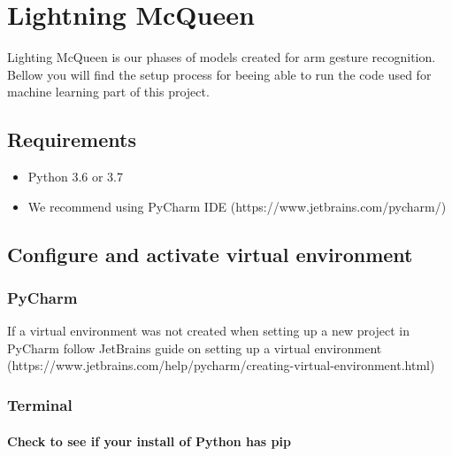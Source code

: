 \documentclass[
]{article}
\author{}
\date{}
\begin{document}
\hypertarget{lightning-mcqueen}{%
\section{Lightning McQueen}\label{lightning-mcqueen}}

Lighting McQueen is our phases of models created for arm gesture
recognition. Bellow you will find the setup process for beeing able to
run the code used for machine learning part of this project.

\hypertarget{requirements}{%
\subsection{Requirements}\label{requirements}}

\begin{itemize}
\item
  Python 3.6 or 3.7
\item
  We recommend using PyCharm IDE (https://www.jetbrains.com/pycharm/)
\end{itemize}

\hypertarget{configure-and-activate-virtual-environment}{%
\subsection{Configure and activate virtual
environment﻿}\label{configure-and-activate-virtual-environment}}

\hypertarget{pycharm}{%
\subsubsection{PyCharm}\label{pycharm}}

If a virtual environment﻿ was not created when setting up a new project
in PyCharm follow JetBrains guide on setting up a virtual environment
(https://www.jetbrains.com/help/pycharm/creating-virtual-environment.html)

\hypertarget{terminal}{%
\subsubsection{Terminal}\label{terminal}}

\hypertarget{check-to-see-if-your-install-of-python-has-pip}{%
\paragraph{Check to see if your install of Python has
pip}\label{check-to-see-if-your-install-of-python-has-pip}}
\end{document}
